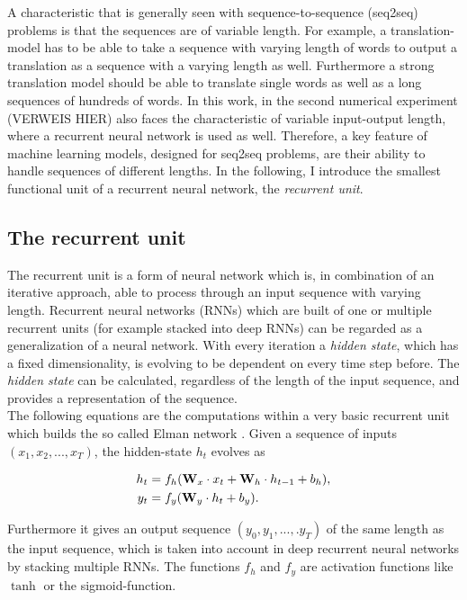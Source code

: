 A characteristic that is generally seen with sequence-to-sequence (seq2seq) problems is that the sequences are of variable length. For example, a translation-model has to be able to take a sequence with varying length of words to output a translation as a sequence with a varying length as well. Furthermore a strong translation model should be able to translate single words as well as a long sequences of hundreds of words. In this work, in the second numerical experiment (VERWEIS HIER) also faces the characteristic of variable input-output length, where a recurrent neural network is used as well.
Therefore, a key feature of machine learning models, designed for seq2seq problems, are their ability to handle sequences of different lengths. In the following, I introduce the smallest functional unit of a recurrent neural network, the \textit{recurrent unit}.

\subsection{The recurrent unit}
The recurrent unit is a form of neural network which is, in combination of an iterative approach, able to process through an input sequence with varying length. Recurrent neural networks (RNNs) which are built of one or multiple recurrent units (for example stacked into deep RNNs) can be regarded as a generalization of a neural network. With every iteration a \textit{hidden state}, which has a fixed dimensionality, is evolving to be dependent on every time step before. The \textit{hidden state} can be calculated, regardless of the length of the input sequence, and provides a representation of the sequence. \\

The following equations are the computations within a very basic recurrent unit which builds the so called Elman network \cite{elman_finding_1990}. Given a sequence of inputs $(x_1,x_2,...,x_T)$, the hidden-state $h_t$ evolves as

\begin{align}
    h_{t}&=f_h(\textbf{W}_{x}\cdot x_t + \textbf{W}_h\cdot h_{t-1} + b_h),\notag\\
    y_t&=f_y(\textbf{W}_y\cdot h_t + b_y).\notag\\
    \label{eq:vanillarnn}
\end{align}

Furthermore it gives an output sequence $(y_0,y_1,...,.y_T)$ of the same length as the input sequence, which is taken into account in deep recurrent neural networks by stacking multiple RNNs. The functions $f_h$ and $f_y$ are activation functions like $\tanh$ or the sigmoid-function. \\

